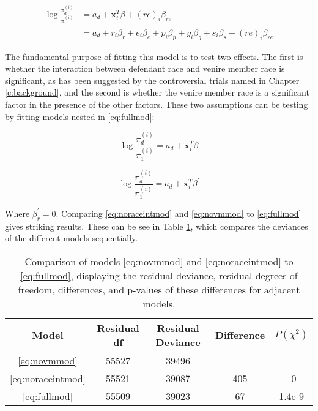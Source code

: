\begin{equation}
  \label{eq:fullmod}
  \begin{split}
    \log \frac{\pi_d^{(i)}}{\pi_1^{(i)}} & = a_d + \mathbf{x}_i^T \beta + (re)_i \beta_{re} \\
    & = a_d + r_i \beta_r + e_i \beta_e + p_i \beta_p + g_i \beta_g + s_i \beta_s + (re)_i \beta_{re}
  \end{split}
\end{equation}

The fundamental purpose of fitting this model is to test two effects. The first is whether the interaction between defendant race
and venire member race is significant, as has been suggested by the
controversial trials named in Chapter \ref{c:background}, and the
second is whether the venire member race is a significant factor in the presence of the other factors. These two
assumptions can be testing by fitting models nested in \ref{eq:fullmod}:

\begin{equation}
  \label{eq:noraceintmod}
  \log \frac{\pi_d^{(i)}}{\pi_1^{(i)}} = a_d + \mathbf{x}_i^T \beta
\end{equation}

\begin{equation}
  \label{eq:novmmod}
  \log \frac{\pi_d^{(i)}}{\pi_1^{(i)}} = a_d + \mathbf{x}_i^T \beta^{\prime}
\end{equation}

Where $\beta^{\prime}_r = 0$. Comparing \ref{eq:noraceintmod} and \ref{eq:novmmod} to \ref{eq:fullmod} gives striking
results. These can be see in Table \ref{tab:modcomp}, which compares the deviances of the different models sequentially.

\begin{table}[h!]
  \centering
  \caption[Nested ANOVA Table Demonstrating the Importance of
  Race]{\footnotesize Comparison of models \ref{eq:novmmod} and \ref{eq:noraceintmod}
    to \ref{eq:fullmod}, displaying the residual deviance, residual degrees of freedom, differences, and p-values of these
    differences for adjacent models.}
  \label{tab:modcomp}
  \begin{tabular}{|c|c|c|c|c|} \hline
    Model & Residual df & Residual Deviance & Difference & $P(\chi^2)$ \\ \hline
    \ref{eq:novmmod} & 55527 & 39496 &  &  \\
    \ref{eq:noraceintmod} & 55521 & 39087 & 405 & ~0 \\
    \ref{eq:fullmod} & 55509 & 39023 & 67 & 1.4e-9 \\ \hline
  \end{tabular}
\end{table}

